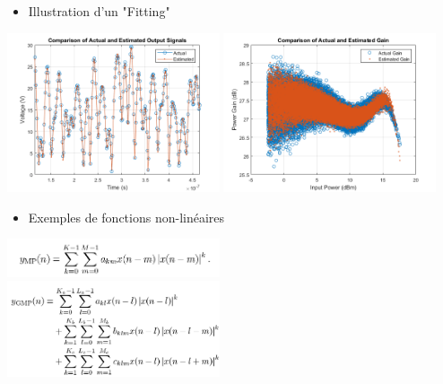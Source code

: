 \documentclass[aspectratio=169]{beamer}
\begin{document}
\begin{frame}
\begin{columns}[T]
\begin{column}{0.5\textwidth}
    \end{column}
    \begin{column}{0.6\textwidth}
      \begin{itemize}
        \item Illustration d'un "Fitting"
      \end{itemize}
      \vspace{-0.5\baselineskip}
      \begin{center}
        \includegraphics[width=0.49\textwidth]{PowerAmplifierCharacterizationExample-05}
        \includegraphics[width=0.49\textwidth]{PowerAmplifierCharacterizationExample-08}
      \end{center}
      \vspace{-\baselineskip}
      \begin{itemize}
        \item Exemples de fonctions non-linéaires
      \end{itemize}
      \vspace{-0.5\baselineskip}
      \begin{center}
        \includegraphics[width=0.49\textwidth]{modelling-rf-power-amplifiers-with-dpd-using-matlab-white-paper-extract-pic-008}\\
        \includegraphics[width=0.49\textwidth]{modelling-rf-power-amplifiers-with-dpd-using-matlab-white-paper-extract-pic-010}
      \end{center}
    \end{column}
  \end{columns}

\end{frame}
\end{document}
